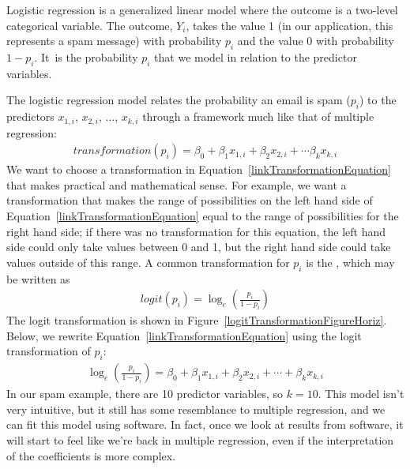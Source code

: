 Logistic regression is a generalized linear model where the outcome is a two-level categorical variable. The outcome, $Y_i$, takes the value 1 (in our application, this represents a spam message) with probability $p_i$ and the value 0 with probability $1-p_i$. It~is the probability $p_i$ that we model in relation to the predictor variables.

The logistic regression model relates the probability an email is spam ($p_i$) to the predictors $x_{1,i}$, $x_{2,i}$, ..., $x_{k,i}$ through a framework much like that of multiple regression:
\begin{align}
transformation(p_{i}) = \beta_0 + \beta_1x_{1,i} + \beta_2 x_{2,i} + \cdots \beta_k x_{k,i}
\label{linkTransformationEquation}
\end{align}
We want to choose a transformation in Equation~\eqref{linkTransformationEquation} that makes practical and mathematical sense. For example, we want a transformation that makes the range of possibilities on the left hand side of Equation~\eqref{linkTransformationEquation} equal to the range of possibilities for the right hand side; if there was no transformation for this equation, the left hand side could only take values between 0 and 1, but the right hand side could take values outside of this range. A common transformation for $p_i$ is the , which may be written as
\begin{align*}
logit(p_i) = \log_{e}\left( \frac{p_i}{1-p_i} \right)
\end{align*}
The logit transformation is shown in Figure~\ref{logitTransformationFigureHoriz}. Below, we rewrite Equation~\eqref{linkTransformationEquation} using the logit transformation of $p_i$:
\begin{align*}
\log_{e}\left( \frac{p_i}{1-p_i} \right)
	= \beta_0 + \beta_1 x_{1,i} + \beta_2 x_{2,i} + \cdots + \beta_k x_{k,i}
\end{align*}
In our spam example, there are 10 predictor variables, so $k = 10$. This model isn't very intuitive, but it still has some resemblance to multiple regression, and we can fit this model using software. In fact, once we look at results from software, it will start to feel like we're back in multiple regression, even if the interpretation of the coefficients is more complex.

\textC{\newpage}

